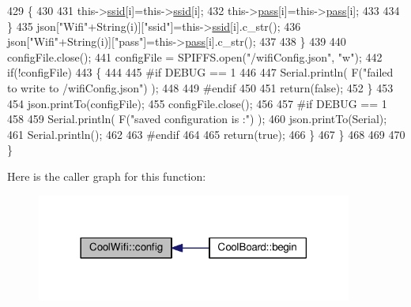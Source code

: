 \begin{DoxyCode}
429                 \{
430                     
431                     this->\hyperlink{classCoolWifi_a893b21d0fed821438733bba2e73fb4c2}{ssid}[i]=this->\hyperlink{classCoolWifi_a893b21d0fed821438733bba2e73fb4c2}{ssid}[i];
432                     this->\hyperlink{classCoolWifi_a0c3332a149245aaad060b32593a54c9b}{pass}[i]=this->\hyperlink{classCoolWifi_a0c3332a149245aaad060b32593a54c9b}{pass}[i];                    
433                     
434                 \}
435                 json[\textcolor{stringliteral}{"Wifi"}+String(i)][\textcolor{stringliteral}{"ssid"}]=this->\hyperlink{classCoolWifi_a893b21d0fed821438733bba2e73fb4c2}{ssid}[i].c\_str();
436                 json[\textcolor{stringliteral}{"Wifi"}+String(i)][\textcolor{stringliteral}{"pass"}]=this->\hyperlink{classCoolWifi_a0c3332a149245aaad060b32593a54c9b}{pass}[i].c\_str();           
437                         
438             \}
439 
440             configFile.close();
441             configFile = SPIFFS.open(\textcolor{stringliteral}{"/wifiConfig.json"}, \textcolor{stringliteral}{"w"});
442             \textcolor{keywordflow}{if}(!configFile)
443             \{
444             
445 \textcolor{preprocessor}{            #if DEBUG == 1 }
446 
447                 Serial.println( F(\textcolor{stringliteral}{"failed to write to /wifiConfig.json"}) );
448             
449 \textcolor{preprocessor}{            #endif}
450 
451                 \textcolor{keywordflow}{return}(\textcolor{keyword}{false});              
452             \}
453             
454             json.printTo(configFile);
455             configFile.close();
456 
457 \textcolor{preprocessor}{        #if DEBUG == 1 }
458 
459             Serial.println( F(\textcolor{stringliteral}{"saved configuration is :"}) );
460             json.printTo(Serial);
461             Serial.println();
462         
463 \textcolor{preprocessor}{        #endif}
464 
465             \textcolor{keywordflow}{return}(\textcolor{keyword}{true}); 
466         \}
467     \}   
468     
469 
470 \}
\end{DoxyCode}
Here is the caller graph for this function\+:\nopagebreak
\begin{figure}[H]
\begin{center}
\leavevmode
\includegraphics[width=294pt]{classCoolWifi_a4eb2f6b9b09dd588964b88b6c70122c0_icgraph}
\end{center}
\end{figure}
\mbox{\label{classCoolWifi_a2a9a546f76816c8c5c8e2d46a6c4f07d}} 
